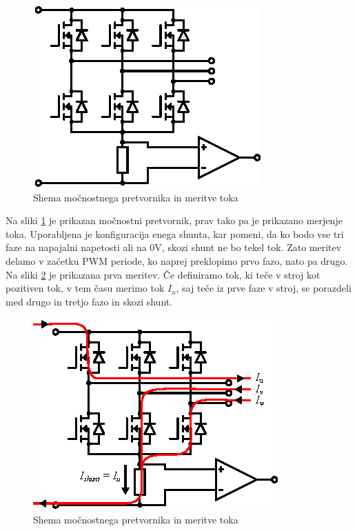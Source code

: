 \documentclass[a4paper,twoside,openright,12pt,slovene]{book}
\begin{document}
\begin{figure}[!htbp]
    \centering
    \includegraphics[width=0.75\columnwidth]{Slike/Inkscape/inverter.eps}
    \caption{\label{inverter} Shema močnostnega pretvornika in meritve toka }
\end{figure}

Na sliki \ref{inverter} je prikazan močnostni pretvornik, prav tako pa je prikazano merjenje toka. Uporabljena je konfiguracija enega shunta, kar pomeni, da ko bodo vse tri faze na napajalni
napetosti ali na 0V, skozi shunt ne bo tekel tok. Zato meritev delamo v začetku PWM periode, ko naprej preklopimo prvo fazo, nato pa drugo. Na sliki \ref{meritevTokaIu} je prikazana prva meritev.
Če definiramo tok, ki teče v stroj kot pozitiven tok, v tem času merimo tok $I_u$, saj teče iz prve faze v stroj, se porazdeli med drugo in tretjo fazo in skozi shunt. 

\begin{figure}[!htbp]
    \centering
    \includegraphics[width=0.75\columnwidth]{Slike/Inkscape/meritevTokaIu.eps}
    \caption{\label{meritevTokaIu} Shema močnostnega pretvornika in meritve toka }
\end{figure}
\end{document}
